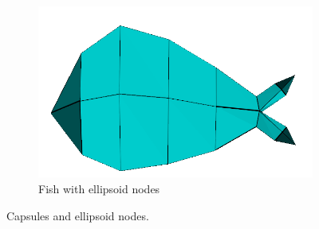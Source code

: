 \begin{figure}[h]
\begin{subfigure}[b]{0.4\textwidth}
                \includegraphics[width=\textwidth]{images/ryba_mesh.png}
                \caption{Fish with ellipsoid nodes}
                \label{fig:fish}
        \end{subfigure}
        \caption[Capsules and ellipsoid nodes]{Capsules and ellipsoid nodes.}\label{fig:caps_ell}
\end{figure}

